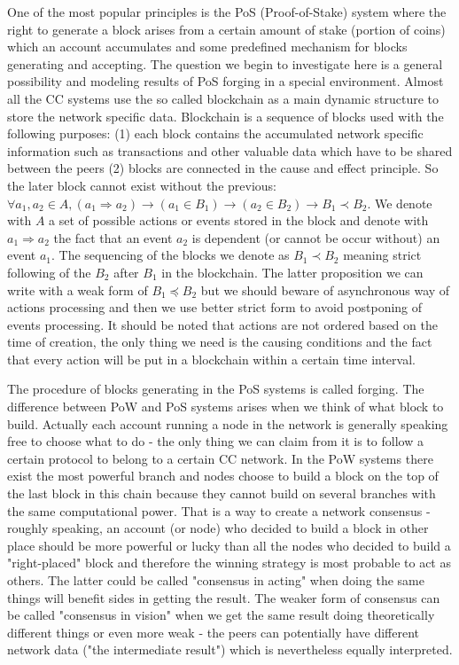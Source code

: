 \documentclass[12pt]{article}
\begin{document}
One of the most popular principles is the PoS 
(Proof-of-Stake) system where the right to generate a block arises from a certain amount of stake (portion of coins) which 
an account accumulates and some predefined mechanism for blocks generating and accepting. The question we begin to investigate here is a 
general possibility and modeling results of PoS forging in a special environment. Almost all the CC systems use the so called blockchain as a 
main dynamic structure to store the network specific data. Blockchain is a sequence of blocks used with the following purposes: (1) each block contains the 
accumulated network specific information such as transactions and other valuable data which have to be shared between the peers 
(2) blocks are connected in the cause and effect principle. So the later block cannot exist without
the previous: $\forall a_1,a_2\in A, (a_1\Rightarrow a_2) \to (a_1\in B_1) \to (a_2\in B_2) \to B_1 \prec B_2$. We denote with $A$ a set of possible actions or 
events stored in the block and denote with $a_1\Rightarrow a_2$ the fact that an event $a_2$ is dependent (or cannot be occur without) an event $a_1$. 
The sequencing of the
blocks we denote as $B_1 \prec B_2$ meaning strict following of the $B_2$ after $B_1$ in the blockchain. The latter proposition we can write with a weak form of
$B_1 \preceq B_2$ but we should beware of asynchronous way of actions processing and then we use better strict form to avoid postponing of events processing. 
It should be noted
that actions are not ordered based on the time of creation, the only thing we need is the causing conditions and the fact that every action 
will be put in a blockchain within a certain time interval. 

The procedure of blocks generating in the PoS systems is called forging. The difference between PoW and PoS systems arises when we think
of what block to build. Actually each account running a node in the network is generally speaking free to choose what to do \-- the only thing we can claim from it
is to follow a certain protocol to belong to a certain CC network. In the PoW systems there exist the most powerful branch and nodes choose to 
build a block on the top of the last block in this chain because they cannot build on several branches with the same computational power. That is a way 
to create a network consensus \--
roughly speaking, an account (or node) who decided to build a block in other place should be more powerful or lucky 
than all the nodes who decided to build a "right-placed" block and therefore
the winning strategy is most probable to act as others. 
The latter could be called "consensus in acting" when doing the same things will benefit sides in getting 
the result. The weaker form of consensus can be called "consensus in vision" when we get the same result doing theoretically different things or even more weak \--
the peers can potentially have different network data ("the intermediate result") which is nevertheless equally interpreted.
 
\end{document}
